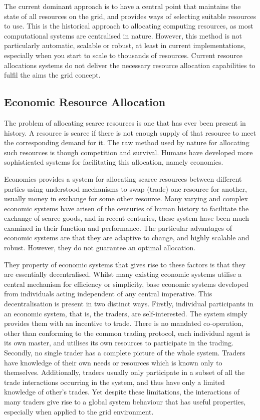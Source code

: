 The current dominant approach is to have a central point that maintains the
state of all resources on the grid, and provides ways of selecting suitable
resources to use. This is the historical approach to allocating computing
resources, as most computational systems are centralised in nature. However,
this method is not particularly automatic, scalable or robust, at least in
current implementations, especially when you start to scale to thousands of
resources. Current resource allocations systems do not deliver the necessary
resource allocation capabilities to fulfil the aims the grid concept.


\subsection{Economic Resource Allocation}

The problem of allocating scarce resources is one that has ever been present in
history. A resource is scarce if there is not enough supply of that resource to
meet the corresponding demand for it.  The raw method used by nature for
allocating such resources is though competition and survival.  Humans have
developed more sophisticated systems for facilitating this allocation, namely
economics.

Economics provides a system for allocating scarce resources between different
parties using understood mechanisms to swap (trade) one resource for another,
usually money in exchange for some other resource.  Many varying and complex
economic systems have arisen of the centuries of human history to facilitate
the exchange of scarce goods, and in recent centuries, these system have been
much examined in their function and performance. The particular advantages of
economic systems are that they are adaptive to change, and highly scalable and
robust.  However, they do not guarantee an optimal allocation.

They property of economic systems that gives rise to these factors is that they
are essentially decentralised. Whilst many existing economic systems utilise a
central mechanism for efficiency or simplicity, base economic systems developed
from individuals acting independent of any central imperative. This
decentralisation is present in two distinct ways. Firstly, individual
participants in an economic system, that is, the traders, are self-interested.
The system simply provides them with an incentive to trade. There is no
mandated co-operation, other than conforming to the common trading protocol,
each individual agent is its own master, and utilises its own resources to
participate in the trading.  Secondly, no single trader has a complete picture
of the whole system.  Traders have knowledge of their own needs or resources
which is known only to themselves. Additionally, traders usually only
participate in a subset of all the trade interactions occurring in the system,
and thus have only a limited knowledge of other's trades.  Yet despite these
limitations, the interactions of many traders give rise to a global system
behaviour that has useful properties, especially when applied to the grid
environment.

